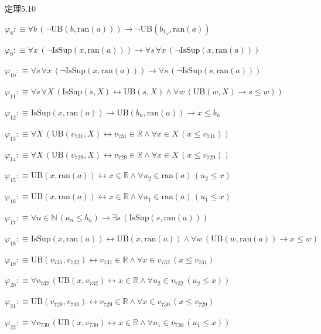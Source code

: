 \begin{fullproof}{定理5.10}
\begin{abbrevlist}
\item $\varphi_{8} :\equiv \forall b\,(\neg \mathrm{UB}(b,\mathrm{ran}(a))) \to \neg \mathrm{UB}(b_{1_{\omega}},\mathrm{ran}(a))$
\item $\varphi_{9} :\equiv \forall x\,(\neg \mathrm{IsSup}(x,\mathrm{ran}(a))) \to \forall s\,\forall x\,(\neg \mathrm{IsSup}(x,\mathrm{ran}(a)))$
\item $\varphi_{10} :\equiv \forall s\,\forall x\,(\neg \mathrm{IsSup}(x,\mathrm{ran}(a))) \to \forall s\,(\neg \mathrm{IsSup}(s,\mathrm{ran}(a)))$
\item $\varphi_{11} :\equiv \forall s\,\forall X\,(\mathrm{IsSup}(s,X) \leftrightarrow \mathrm{UB}(s,X) \land \forall w\,(\mathrm{UB}(w,X) \to s \leq w))$
\item $\varphi_{12} :\equiv \mathrm{IsSup}(x,\mathrm{ran}(a)) \to \mathrm{UB}(b_{n},\mathrm{ran}(a)) \to x \leq b_{n}$
\item $\varphi_{13} :\equiv \forall X\,(\mathrm{UB}(v_{731},X) \leftrightarrow v_{731} \in \mathbb{R} \land \forall x \in X\,(x \leq v_{731}))$
\item $\varphi_{14} :\equiv \forall X\,(\mathrm{UB}(v_{729},X) \leftrightarrow v_{729} \in \mathbb{R} \land \forall x \in X\,(x \leq v_{729}))$
\item $\varphi_{15} :\equiv \mathrm{UB}(x,\mathrm{ran}(a)) \leftrightarrow x \in \mathbb{R} \land \forall u_{2} \in \mathrm{ran}(a)\,(u_{2} \leq x)$
\item $\varphi_{16} :\equiv \mathrm{UB}(x,\mathrm{ran}(a)) \leftrightarrow x \in \mathbb{R} \land \forall u_{1} \in \mathrm{ran}(a)\,(u_{1} \leq x)$
\item $\varphi_{17} :\equiv \forall n \in \mathbb{N}\,(a_{n} \leq b_{n}) \to \exists s\,(\mathrm{IsSup}(s,\mathrm{ran}(a)))$
\item $\varphi_{18} :\equiv \mathrm{IsSup}(x,\mathrm{ran}(a)) \leftrightarrow \mathrm{UB}(x,\mathrm{ran}(a)) \land \forall w\,(\mathrm{UB}(w,\mathrm{ran}(a)) \to x \leq w)$
\item $\varphi_{19} :\equiv \mathrm{UB}(v_{731},v_{732}) \leftrightarrow v_{731} \in \mathbb{R} \land \forall x \in v_{732}\,(x \leq v_{731})$
\item $\varphi_{20} :\equiv \forall v_{732}\,(\mathrm{UB}(x,v_{732}) \leftrightarrow x \in \mathbb{R} \land \forall u_{2} \in v_{732}\,(u_{2} \leq x))$
\item $\varphi_{21} :\equiv \mathrm{UB}(v_{729},v_{730}) \leftrightarrow v_{729} \in \mathbb{R} \land \forall x \in v_{730}\,(x \leq v_{729})$
\item $\varphi_{22} :\equiv \forall v_{730}\,(\mathrm{UB}(x,v_{730}) \leftrightarrow x \in \mathbb{R} \land \forall u_{1} \in v_{730}\,(u_{1} \leq x))$

\end{abbrevlist}
\end{fullproof}
